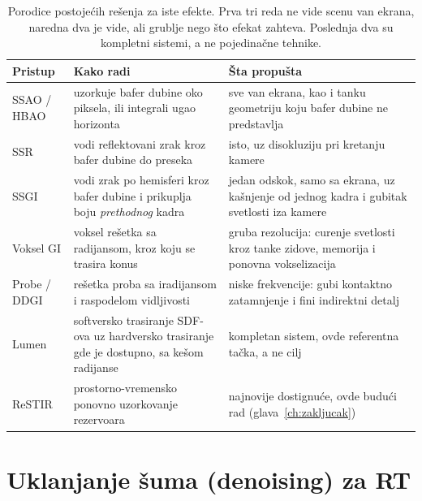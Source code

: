 \begin{table}[tbp]
\caption[Postoje\'ci pristupi i njihova ograni\v{c}enja]{Porodice postoje\'cih re\v{s}enja za iste efekte.
Prva tri reda ne vide scenu van ekrana, naredna dva je vide, ali grublje nego \v{s}to efekat zahteva.
Poslednja dva su kompletni sistemi, a ne pojedina\v{c}ne tehnike.}
\label{tab:postojeca}
\centering
\small
\begin{tabularx}{\textwidth}{@{}l>{\raggedright\arraybackslash}X>{\raggedright\arraybackslash}X@{}}
\toprule
Pristup & Kako radi & \v{S}ta propu\v{s}ta \\
\midrule
SSAO / HBAO \cite{mittring2007cryengine, bavoil2008hbao}
  & uzorkuje bafer dubine oko piksela, ili integrali ugao horizonta
  & sve van ekrana, kao i tanku geometriju koju bafer dubine ne predstavlja \\
\addlinespace[2pt]
SSR
  & vodi reflektovani zrak kroz bafer dubine do preseka
  & isto, uz disokluziju pri kretanju kamere \\
\addlinespace[2pt]
SSGI
  & vodi zrak po hemisferi kroz bafer dubine i prikuplja boju \emph{prethodnog} kadra
  & jedan odskok, samo sa ekrana, uz ka\v{s}njenje od jednog kadra i gubitak svetlosti iza kamere \\
\addlinespace[2pt]
Voksel GI \cite{crassin2011vxgi}
  & voksel re\v{s}etka sa radijansom, kroz koju se trasira konus
  & gruba rezolucija: curenje svetlosti kroz tanke zidove, memorija i ponovna vokselizacija \\
\addlinespace[2pt]
Probe / DDGI \cite{majercik2019ddgi, nvidia_rtxgi}
  & re\v{s}etka proba sa iradijansom i raspodelom vidljivosti
  & niske frekvencije: gubi kontaktno zatamnjenje i fini indirektni detalj \\
\addlinespace[2pt]
Lumen \cite{epic_lumen}
  & softversko trasiranje SDF-ova uz hardversko trasiranje gde je dostupno, sa ke\v{s}om radijanse
  & kompletan sistem, ovde referentna ta\v{c}ka, a ne cilj \\
\addlinespace[2pt]
ReSTIR \cite{bitterli2020restir, ouyang2021restirgi}
  & prostorno-vremensko ponovno uzorkovanje rezervoara
  & najnovije dostignu\'ce, ovde budu\'ci rad (glava~\ref{ch:zakljucak}) \\
\bottomrule
\end{tabularx}
\end{table}

\section{Uklanjanje \v{s}uma (denoising) za RT}
\label{sec:denoise-pregled}


